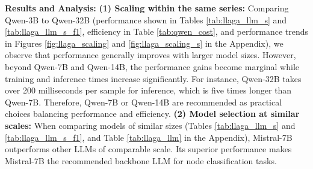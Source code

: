 \textbf{Results and Analysis: } \textbf{(1) Scaling within the same series: }Comparing Qwen-3B to Qwen-32B (performance shown in Tables \ref{tab:llaga_llm_s} and \ref{tab:llaga_llm_s_f1}, efficiency in Table \ref{tab:qwen_cost}, and performance trends in Figures \ref{fig:llaga_scaling} and \ref{fig:llaga_scaling_s} in the Appendix), we observe that performance generally improves with larger model sizes. However, beyond Qwen-7B and Qwen-14B, the performance gains become marginal while training and inference times increase significantly. For instance, Qwen-32B takes over 200 milliseconds per sample for inference, which is five times longer than Qwen-7B. Therefore, Qwen-7B or Qwen-14B are recommended as practical choices balancing performance and efficiency. \textbf{(2) Model selection at similar scales: }When comparing models of similar sizes (Tables \ref{tab:llaga_llm_s} and \ref{tab:llaga_llm_s_f1}, and Table \ref{tab:llaga_llm} in the Appendix), Mistral-7B outperforms other LLMs of comparable scale. Its superior performance makes Mistral-7B the recommended backbone LLM for node classification tasks.


